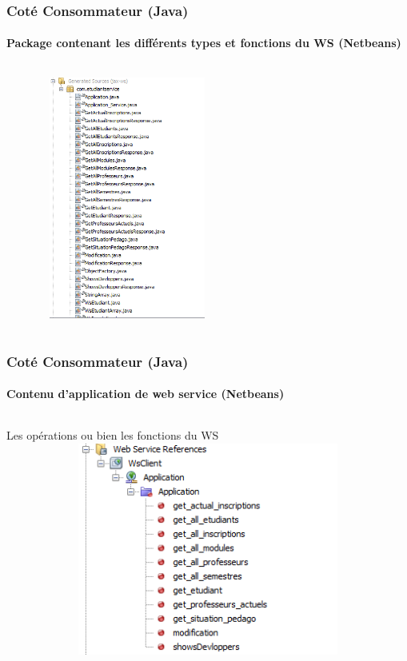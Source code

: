 \begin{frame}
\frametitle{Coté Consommateur (Java)}
\framesubtitle{Package contenant les différents types et fonctions du WS (Netbeans)}
\transsplithorizontalin[duration=1]
\begin{columns}
\begin{column}{8cm}
 \begin{alertblock}{}
 \includegraphics[width=8cm,height=8cm]{images/clientCaptures/etape7_package_fonctions_responses_types.png}
  \end{alertblock}
\end{column}
\end{columns}
\end{frame}

\begin{frame}
\frametitle{Coté Consommateur (Java)}
\framesubtitle{Contenu d'application de web service (Netbeans)}
\transsplithorizontalin[duration=1]
\begin{columns}
\begin{column}{14cm}
 \begin{alertblock}{Les opérations ou bien les fonctions du WS}
 \includegraphics[width=14cm,height=7cm]{images/clientCaptures/etape8_servives_utilisess.png}
  \end{alertblock}
\end{column}
\end{columns}
\end{frame}

